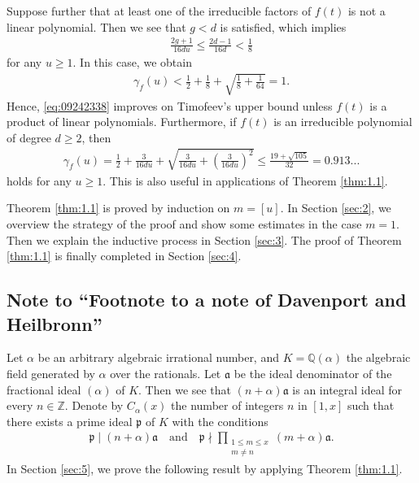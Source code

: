 \documentclass[a4paper,11pt]{amsart}
\theoremstyle{definition}
\numberwithin{equation}{section}
\begin{document}
Suppose further that at least one of the irreducible factors of $f(t)$ is not a linear polynomial. 
Then we see that $g<d$ is satisfied, which implies 
\begin{align*}
\frac{2g+1}{16du}
\leq \frac{2d-1}{16d}
< \frac{1}{8}
\end{align*}
for any $u \geq1$. 
In this case, we obtain
\begin{align*}
\gamma_f(u)
< \frac{1}{2}+\frac{1}{8}+\sqrt{\frac{1}{8}+\frac{1}{64}}
= 1. 
\end{align*}
Hence, \eqref{eq:09242338} improves on Timofeev's upper bound unless $f(t)$ is a product of linear polynomials. 
Furthermore, if $f(t)$ is an irreducible polynomial of degree $d \geq2$, then 
\begin{align}\label{eq:10031502}
\gamma_f(u)
= \frac{1}{2}+\frac{3}{16du}+\sqrt{\frac{3}{16du}+\left(\frac{3}{16du}\right)^2} 
\leq \frac{19+\sqrt{105}}{32}
= 0.913...
\end{align}
holds for any $u \geq1$. 
This is also useful in applications of Theorem \ref{thm:1.1}. 

Theorem \ref{thm:1.1} is proved by induction on $m=[u]$. 
In Section \ref{sec:2}, we overview the strategy of the proof and show some estimates in the case $m=1$. 
Then we explain the inductive process in Section \ref{sec:3}. 
The proof of Theorem \ref{thm:1.1} is finally completed in Section \ref{sec:4}. 


\subsection{Note to ``Footnote to a note of Davenport and Heilbronn''}\label{sec:1.2}
Let $\alpha$ be an arbitrary algebraic irrational number, and $K=\mathbb{Q}(\alpha)$ the algebraic field generated by $\alpha$ over the rationals. 
Let $\mathfrak{a}$ be the ideal denominator of the fractional ideal $(\alpha)$ of $K$. 
Then we see that $(n+\alpha)\mathfrak{a}$ is an integral ideal for every $n \in \mathbb{Z}$. 
Denote by $C_\alpha(x)$ the number of integers $n$ in $[1,x]$ such that there exists a prime ideal $\mathfrak{p}$ of $K$ with the conditions 
\begin{align}\label{eq:10022256}
\mathfrak{p} \mid (n+\alpha)\mathfrak{a}
\quad\text{and}\quad
\mathfrak{p} \nmid \prod_{\substack{1 \leq m \leq x \\ m \neq n}} (m+\alpha)\mathfrak{a}. 
\end{align}
In Section \ref{sec:5}, we prove the following result by applying Theorem \ref{thm:1.1}. 
\end{document}
